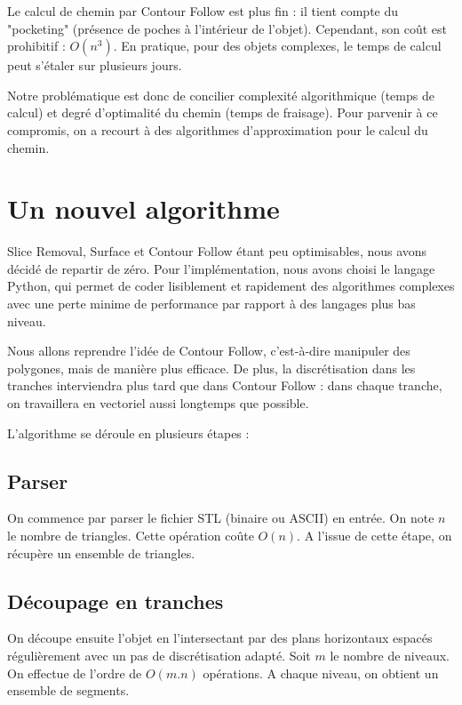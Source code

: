 \documentclass{article}
\begin{document}
Le calcul de chemin par Contour Follow est plus fin : il tient compte du "pocketing" (présence de poches à l'intérieur de l'objet). Cependant, son coût est prohibitif : $O(n^{3})$. En pratique, pour des objets complexes, le temps de calcul peut s'étaler sur plusieurs jours.

Notre problématique est donc de concilier complexité algorithmique (temps de calcul) et degré d'optimalité du chemin (temps de fraisage). Pour parvenir à ce compromis, on a recourt à des algorithmes d'approximation pour le calcul du chemin.

\section{Un nouvel algorithme}

Slice Removal, Surface et Contour Follow étant peu optimisables, nous avons décidé de repartir de zéro. Pour l'implémentation, nous avons choisi le langage Python, qui permet de coder lisiblement et rapidement des algorithmes complexes avec une perte minime de performance par rapport à des langages plus bas niveau.

Nous allons reprendre l'idée de Contour Follow, c'est-à-dire manipuler des polygones, mais de manière plus efficace. De plus, la discrétisation dans les tranches interviendra plus tard que dans Contour Follow : dans chaque tranche, on travaillera en vectoriel aussi longtemps que possible.

L'algorithme se déroule en plusieurs étapes :

\subsection{Parser}

On commence par parser le fichier STL (binaire ou ASCII) en entrée. On note $n$ le nombre de triangles. Cette opération coûte $O(n)$. A l'issue de cette étape, on récupère un ensemble de triangles.

\subsection{Découpage en tranches}

On découpe ensuite l'objet en l'intersectant par des plans horizontaux espacés régulièrement avec un pas de discrétisation adapté. Soit $m$ le nombre de niveaux. On effectue de l'ordre de $O(m.n)$ opérations. A chaque niveau, on obtient un ensemble de segments.
\end{document}
